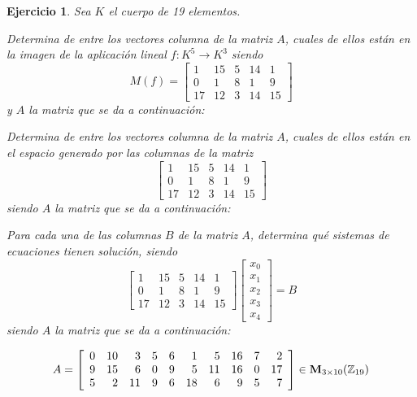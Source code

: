 \documentclass[12pt]{amsart}
\newtheorem{ejer}{Ejercicio}
\begin{document}
\begin{ejer} Sea $K$ el cuerpo de 19 elementos.
\newline
\noindent\begin{minipage}{\textwidth}
\begin{tcolorbox}[colback = green!20!white,title=Versión Núcleo]
Determina de entre los vectores columna de la matriz $A$, cuales de ellos están en la imagen de la aplicación lineal $f:K^{5} \to K^{3}$ siendo  $$ M(f) = \left[\begin{array}{rrrrr}
1 & 15 & 5 & 14 & 1 \\
0 & 1 & 8 & 1 & 9 \\
17 & 12 & 3 & 14 & 15
\end{array}\right] $$ y $A$ la matriz que se da a continuación:\end{tcolorbox}
\end{minipage} \newline
\noindent\begin{minipage}{\textwidth}
\begin{tcolorbox}[colback = blue!20!white,title=Versión Anulador]
Determina de entre los vectores columna de la matriz $A$, cuales de ellos están en el espacio generado por las columnas de la matriz $$ \left[\begin{array}{rrrrr}
1 & 15 & 5 & 14 & 1 \\
0 & 1 & 8 & 1 & 9 \\
17 & 12 & 3 & 14 & 15
\end{array}\right] $$ siendo $A$ la matriz que se da a continuación:\end{tcolorbox}
\end{minipage} \newline
\noindent\begin{minipage}{\textwidth} 
\begin{tcolorbox}[colback = red!20!white,title=Versión Ecuaciones Implícitas]
Para cada una de las columnas $B$ de la matriz $A$, determina qué sistemas de ecuaciones tienen solución, siendo $$ \left[\begin{array}{rrrrr}
1 & 15 & 5 & 14 & 1 \\
0 & 1 & 8 & 1 & 9 \\
17 & 12 & 3 & 14 & 15
\end{array}\right] \left[\begin{array}{r}
x_{0} \\
x_{1} \\
x_{2} \\
x_{3} \\
x_{4}
\end{array}\right] = B$$ siendo $A$ la matriz que se da a continuación:
\end{tcolorbox}
\end{minipage}
\[ A = \left[\begin{array}{rrrrrrrrrr}
0 & 10 & 3 & 5 & 6 & 1 & 5 & 16 & 7 & 2 \\
9 & 15 & 6 & 0 & 9 & 5 & 11 & 16 & 0 & 17 \\
5 & 2 & 11 & 9 & 6 & 18 & 6 & 9 & 5 & 7
\end{array}\right] \in {\bf M}_{3\times 10}({\mathbb Z}_{19})\]
\end{ejer}
\end{document}
